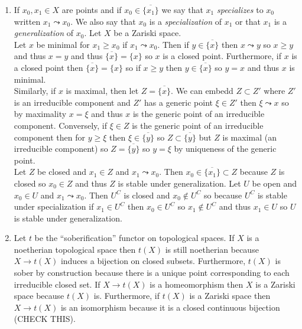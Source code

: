 \documentclass[12pt]{article}
\begin{document}
\begin{enumerate}
\item If $x_0, x_1 \in X$ are points and if $x_0 \in \overline{ \{ x_1 \} }$ we say that $x_1$ \textit{specializes} to $x_0$ written $x_1 \leadsto x_0$. We also say that $x_0$ is a \textit{specialization} of $x_1$ or that $x_1$ is a \textit{generalization} of $x_0$. Let $X$ be a Zariski space. 
\bigskip\\
Let $x$ be minimal for $x_1 \ge x_0$ if $x_1 \leadsto x_0$. Then if $y \in \overline{\{ x \}}$ then $x \leadsto y$ so $x \ge y$ and thus $x = y$ and thus $\overline{ \{ x \} } = \{ x \}$ so $x$ is a closed point. Furthermore, if $x$ is a closed point then $\overline{ \{ x \} } = \{ x \}$ so if $x \ge y$ then $y \in \overline{ \{ x \} }$ so $y = x$ and thus $x$ is minimal. 
\bigskip\\
Similarly, if $x$ is maximal, then let $Z = \overline{ \{ x \} }$. We can embedd $Z \subset Z'$ where $Z'$ is an irreducible component and $Z'$ has a generic point $\xi \in Z'$ then $\xi \leadsto x$ so by maximality $x = \xi$ and thus $x$ is the generic point of an irreducible component. Conversely, if $\xi \in Z$ is the generic point of an irreducible component then for $y \ge \xi$ then $\xi \in \overline{ \{ y \} }$ so $Z \subset \overline{ \{ y \} }$ but $Z$ is maximal (an irreducible component) so $Z = \overline{ \{ y \} }$ so $y = \xi$ by uniqueness of the generic point.
\bigskip\\
Let $Z$ be closed and $x_1 \in Z$ and $x_1 \leadsto x_0$. Then $x_0 \in \overline{ \{ x_1 \} } \subset Z$ because $Z$ is closed so $x_0 \in Z$ and thus $Z$ is stable under generalization. Let $U$ be open and $x_0 \in U$ and $x_1 \leadsto x_0$. Then $U^C$ is closed and $x_0 \notin U^C$ so because $U^C$ is stable under specialization if $x_1 \in U^C$ then $x_0 \in U^C$ so $x_1 \notin U^C$ and thus $x_1 \in U$ so $U$ is stable under generalization.

\item Let $t$ be the ``soberification'' functor on topological spaces. If $X$ is a noetherian topological space then $t(X)$ is still noetherian because $X \to t(X)$ induces a bijection on closed subsets. Furthermore, $t(X)$ is sober by construction because there is a unique point corresponding to each irreducible closed set. If $X \to t(X)$ is a homeomorphism then $X$ is a Zariski space because $t(X)$ is. Furthermore, if $t(X)$ is a Zariski space then $X \to t(X)$ is an isomorphism because it is a closed continuous bijection (CHECK THIS).
\end{enumerate}
\end{document}
